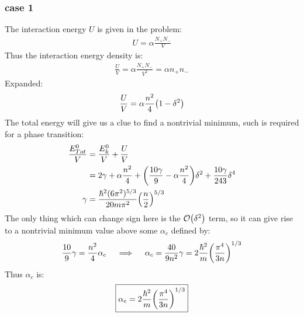 \documentclass[12pt]{article}
\theoremstyle{plain}
\theoremstyle{definition}
\begin{document}
\subsubsection{case 1}
The interaction energy $U$ is given in the problem:
\begin{align*}
  U=\alpha\frac{N_+N_-}{V}
\end{align*}
Thus the interaction energy density is:
\begin{align*}
  \frac{U}{V}=\alpha\frac{N_+N_-}{V^2}=\alpha n_+n_-
\end{align*}
Expanded:
\begin{align*}
  \frac{U}{V}=\alpha\frac{n^2}{4}\qty(1-\delta^2)
\end{align*}
The total energy will give us a clue to find a nontrivial minimum, such is required for a phase transition:
\begin{align*}
  \frac{E^0_{Tot}}{V}&=\frac{E_k^0}{V}+\frac{U}{V}\\
  &=2\gamma+\alpha\frac{n^2}{4}
  +\qty(\frac{10\gamma}{9}-\alpha\frac{n^2}{4})\delta^2
  +\frac{10\gamma}{243}\delta^4\\
  \gamma&=\frac{\hbar^2(6\pi^2)^{5/3}}{20m\pi^2}\qty(\frac{n}{2})^{5/3}
\end{align*}
The only thing which can change sign here is the $\order{\delta^2}$ term, so it can give rise to a nontrivial minimum value above some $\alpha_c$ defined by:
\begin{align*}
  \frac{10}{9}\gamma=\frac{n^2}{4}\alpha_c\quad\implies\quad
  \alpha_c=\frac{40}{9n^2}\gamma=2\frac{\hbar^2}{m}\qty(\frac{\pi^4}{3n})^{1/3}
\end{align*}
Thus $\alpha_c$ is:
\begin{align*}
  \boxed{\alpha_c=2\frac{\hbar^2}{m}\qty(\frac{\pi^4}{3n})^{1/3}}
\end{align*}
\end{document}
